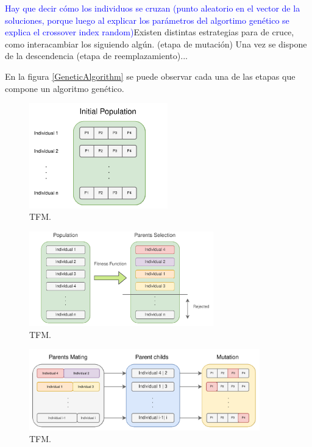 \documentclass{uathesis-es}
\begin{document}
\textcolor{blue}{Hay que decir cómo los individuos se cruzan (punto aleatorio en el vector de la soluciones, porque luego al explicar los parámetros del algortimo genético se explica el crossover index random)}Existen distintas estrategias para de cruce, como interacambiar los   siguiendo algún. (etapa de mutación) Una vez se dispone de la descendencia (etapa de reemplazamiento)...

En la figura \ref{GeneticAlgorithm} se puede observar cada una de las etapas que compone un algoritmo genético.


\begin{figure}[H]
    \centering
    \includegraphics[width=6cm]{Figures/GA/inicializacion.png}
    \caption{TFM.}
    \label{GA_inicializacion}
\end{figure}
\begin{figure}[H]
    \centering
    \includegraphics[width=8cm]{Figures/GA/selection.png}
    \caption{TFM.}
    \label{GA_selection}
\end{figure}
\begin{figure}[H]
    \centering
    \includegraphics[width=10cm]{Figures/GA/cruce_mutacion.png}
    \caption{TFM.}
    \label{GA_cruce_mutacion}
\end{figure}
\end{document}
